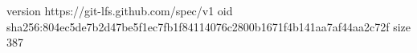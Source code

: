 version https://git-lfs.github.com/spec/v1
oid sha256:804ec5de7b2d47be5f1ec7fb1f84114076c2800b1671f4b141aa7af44aa2c72f
size 387
